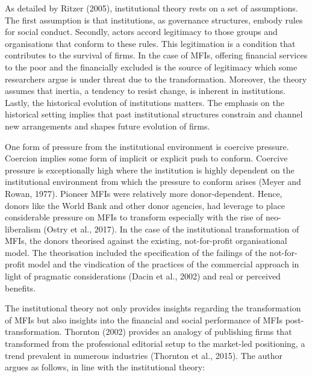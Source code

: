 \documentclass[a4paper, nobind]{templates/ociamthesis}
\begin{document}
As detailed by Ritzer (2005), institutional theory rests on a set of assumptions. The first assumption is that institutions, as governance structures, embody rules for social conduct. Secondly, actors accord legitimacy to those groups and organisations that conform to these rules. This legitimation is a condition that contributes to the survival of firms. In the case of MFIs, offering financial services to the poor and the financially excluded is the source of legitimacy which some researchers argue is under threat due to the transformation. Moreover, the theory assumes that inertia, a tendency to resist change, is inherent in institutions. Lastly, the historical evolution of institutions matters. The emphasis on the historical setting implies that past institutional structures constrain and channel new arrangements and shapes future evolution of firms.

One form of pressure from the institutional environment is coercive pressure. Coercion implies some form of implicit or explicit push to conform. Coercive pressure is exceptionally high where the institution is highly dependent on the institutional environment from which the pressure to conform arises (Meyer and Rowan, 1977). Pioneer MFIs were relatively more donor-dependent. Hence, donors like the World Bank and other donor agencies, had leverage to place considerable pressure on MFIs to transform especially with the rise of neo-liberalism (Ostry et al., 2017). In the case of the institutional transformation of MFIs, the donors theorised against the existing, not-for-profit organisational model. The theorisation included the specification of the failings of the not-for-profit model and the vindication of the practices of the commercial approach in light of pragmatic considerations (Dacin et al., 2002) and real or perceived benefits.

The institutional theory not only provides insights regarding the transformation of MFIs but also insights into the financial and social performance of MFIs post-transformation. Thornton (2002) provides an analogy of publishing firms that transformed from the professional editorial setup to the market-led positioning, a trend prevalent in numerous industries (Thornton et al., 2015). The author argues as follows, in line with the institutional theory:
\end{document}
